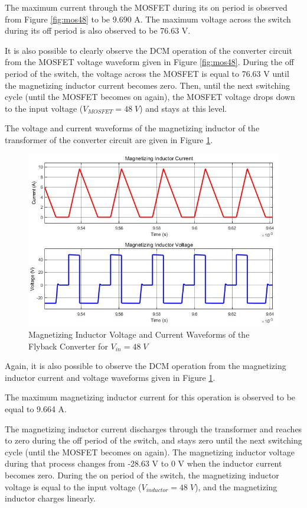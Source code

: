 The maximum current through the MOSFET during its on period is observed from Figure \ref{fig:mos48} to be 9.690 A. The maximum voltage across the switch during its off period is also observed to be 76.63 V.

It is also possible to clearly observe the DCM operation of the converter circuit from the MOSFET voltage waveform given in Figure \ref{fig:mos48}. During the off period of the switch, the voltage across the MOSFET is equal to 76.63 V until the magnetizing inductor current becomes zero. Then, until the next switching cycle (until the MOSFET becomes on again), the MOSFET voltage drops down to the input voltage ($ V_{MOSFET} = 48\;V $) and stays at this level.

The voltage and current waveforms of the magnetizing inductor of the transformer of the converter circuit are given in Figure \ref{fig:ind48}.

\begin{figure}[H]
\begin{center}
\includegraphics[width=1\textwidth]{inductor_curr_volt_48.jpg}
\caption{Magnetizing Inductor Voltage and Current Waveforms of the Flyback Converter for $ V_{in} = 48\;V $}
\label{fig:ind48}
\end{center}
\end{figure}

Again, it is also possible to observe the DCM operation from the magnetizing inductor current and voltage waveforms given in Figure \ref{fig:ind48}.

The maximum magnetizing inductor current for this operation is observed to be equal to 9.664 A.

The magnetizing inductor current discharges through the transformer and reaches to zero during the off period of the switch, and stays zero until the next switching cycle (until the MOSFET becomes on again). The magnetizing inductor voltage during that process changes from -28.63 V to 0 V when the inductor current becomes zero. During the on period of the switch, the magnetizing inductor voltage is equal to the input voltage ($ V_{inductor} = 48\;V $), and the magnetizing inductor charges linearly.

